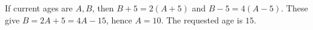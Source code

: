 If current ages are $A,B$, then $B+5=2(A+5)$ and $B-5=4(A-5)$. These give $B=2A+5=4A-15$, hence $A=10$. The requested age is $\boxed{15}$.
